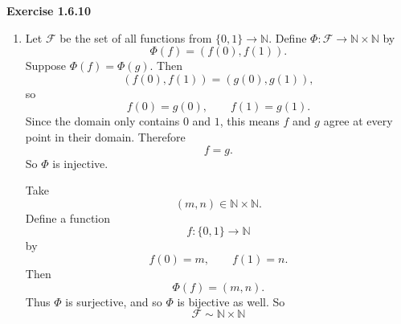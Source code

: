 \documentclass[12pt]{article}
\begin{document}
\noindent{} \textbf{Exercise 1.6.10}
\begin{enumerate}
    \item [(a)]
          Let $\mathcal{F}$ be the set of all functions from $\{0,1\} \to \mathbb{N}$.
          Define $\Phi: \mathcal{F} \to \mathbb{N} \times \mathbb{N}$ by
          \[
              \Phi(f) = (f(0), f(1)).
          \]
          Suppose $\Phi(f) = \Phi(g)$.
          Then
          \[
              (f(0),f(1))=(g(0),g(1)),
          \]
          so
          \[
              f(0)=g(0),\qquad f(1)=g(1).
          \]
          Since the domain only contains \(0\) and \(1\),
          this means \(f\) and \(g\) agree at every point in their domain.
          Therefore
          \[
              f=g.
          \]
          So \(\Phi\) is injective.

          Take \[
              (m,n)\in\mathbb N\times\mathbb N.
          \]
          Define a function
          \[
              f:\{0,1\}\to\mathbb N
          \]
          by
          \[
              f(0)=m,\qquad f(1)=n.
          \]
          Then
          \[
              \Phi(f)=(m,n).
          \]
          Thus \(\Phi\) is surjective, and so \(\Phi\) is bijective as well.
          So
          \[
              \mathcal{F} \sim \mathbb{N} \times \mathbb{N}
          \]


\end{enumerate}
\end{document}
